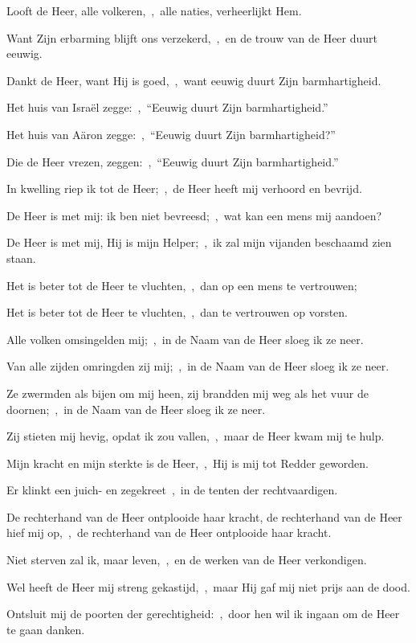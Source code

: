 \documentclass[12pt,twoside,a5paper]{article}
\begin{document}
\begin{halfparskip}
   Looft de Heer, alle volkeren,~\sep\ alle naties, verheerlijkt Hem.

  Want Zijn erbarming blijft ons verzekerd,~\sep\ en de trouw van de Heer duurt eeuwig.

   Dankt de Heer, want Hij is goed,~\sep\ want eeuwig duurt Zijn barmhartigheid.

  Het huis van Israël zegge:~\sep\ ``Eeuwig duurt Zijn barmhartigheid.''

  Het huis van Aäron zegge:~\sep\ ``Eeuwig duurt Zijn barmhartigheid?''

  Die de Heer vrezen, zeggen:~\sep\ ``Eeuwig duurt Zijn barmhartigheid.''

  In kwelling riep ik tot de Heer;~\sep\ de Heer heeft mij verhoord en bevrijd.

  De Heer is met mij: ik ben niet bevreesd;~\sep\ wat kan een mens mij aandoen?

  De Heer is met mij, Hij is mijn Helper;~\sep\ ik zal mijn vijanden beschaamd zien staan.

  Het is beter tot de Heer te vluchten,~\sep\ dan op een mens te vertrouwen;

  Het is beter tot de Heer te vluchten,~\sep\ dan te vertrouwen op vorsten.

  Alle volken omsingelden mij;~\sep\ in de Naam van de Heer sloeg ik ze neer.

  Van alle zijden omringden zij mij;~\sep\ in de Naam van de Heer sloeg ik ze neer.

  Ze zwermden als bijen om mij heen, zij brandden mij weg als het vuur de doornen;~\sep\ in de Naam van de Heer sloeg ik ze neer.

  Zij stieten mij hevig, opdat ik zou vallen,~\sep\ maar de Heer kwam mij te hulp.

  Mijn kracht en mijn sterkte is de Heer,~\sep\ Hij is mij tot Redder geworden.

  Er klinkt een juich- en zegekreet~\sep\ in de tenten der rechtvaardigen.

  De rechterhand van de Heer ontplooide haar kracht, de rechterhand van de Heer hief mij op,~\sep\ de rechterhand van de Heer ontplooide haar kracht.

  Niet sterven zal ik, maar leven,~\sep\ en de werken van de Heer verkondigen.

  Wel heeft de Heer mij streng gekastijd,~\sep\ maar Hij gaf mij niet prijs aan de dood.

  Ontsluit mij de poorten der gerechtigheid:~\sep\ door hen wil ik ingaan om de Heer te gaan danken.


\end{halfparskip}
\end{document}
